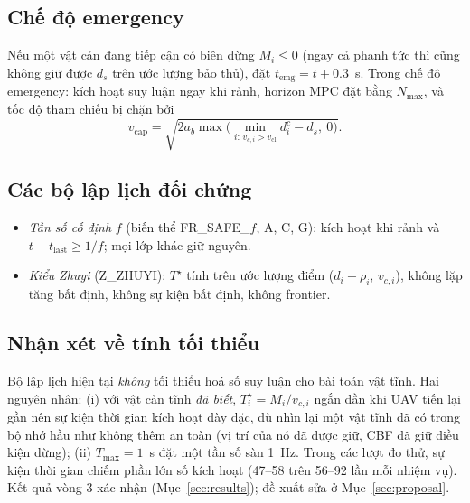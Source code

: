 \documentclass[11pt,a4paper]{article}
\numberwithin{equation}{section}
\theoremstyle{definition}
\theoremstyle{plain}
\theoremstyle{remark}
\begin{document}
\subsection{Chế độ emergency}
\label{sec:emergency}
Nếu một vật cản đang tiếp cận có biên dừng $M_i\le0$ (ngay cả phanh tức thì cũng không giữ được $d_s$ trên ước lượng bảo thủ), đặt $t_{\text{emg}}=t+0.3$~s. Trong chế độ emergency: kích hoạt suy luận ngay khi rảnh, horizon MPC đặt bằng $N_{\max}$, và tốc độ tham chiếu bị chặn bởi
\begin{equation}
v_{\text{cap}}=\sqrt{2a_b\max\big(\min_{i:\,v_{c,i}>v_{\text{cl}}}d^c_i-d_s,\ 0\big)}. \label{eq:vcap}
\end{equation}

\subsection{Các bộ lập lịch đối chứng}
\begin{itemize}
\item \emph{Tần số cố định} $f$ (biến thể FR\_SAFE\_$f$, A, C, G): kích hoạt khi rảnh và $t-t_{\text{last}}\ge1/f$; mọi lớp khác giữ nguyên.
\item \emph{Kiểu Zhuyi} (Z\_ZHUYI): $T^\star$ tính trên ước lượng điểm ($d_i-\rho_i$, $v_{c,i}$), không lặp tăng bất định, không sự kiện bất định, không frontier.
\end{itemize}

\subsection{Nhận xét về tính tối thiểu}
\label{sec:schednote}
Bộ lập lịch hiện tại \emph{không} tối thiểu hoá số suy luận cho bài toán vật tĩnh. Hai nguyên nhân: (i) với vật cản tĩnh \emph{đã biết}, $T^\star_i=M_i/\bar v_{c,i}$ ngắn dần khi UAV tiến lại gần nên sự kiện thời gian kích hoạt dày đặc, dù nhìn lại một vật tĩnh đã có trong bộ nhớ hầu như không thêm an toàn (vị trí của nó đã được giữ, CBF đã giữ điều kiện dừng); (ii) $T_{\max}=1$~s đặt một tần số sàn 1~Hz. Trong các lượt đo thử, sự kiện thời gian chiếm phần lớn số kích hoạt (47--58 trên 56--92 lần mỗi nhiệm vụ). Kết quả vòng 3 xác nhận (Mục~\ref{sec:results}); đề xuất sửa ở Mục~\ref{sec:proposal}.

\end{document}
